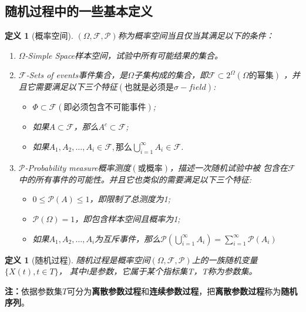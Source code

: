 \documentclass[12pt, a4paper, oneside]{ctexbook}
\newtheorem{definition}[theorem]{定义}
\newcommand\mc[1]{\mathcal{#1}}
\begin{document}
\subsection{随机过程中的一些基本定义}
\begin{definition}[概率空间]
    $(\Omega,\mathcal{F},\mc{P})$称为概率空间当且仅当其满足以下的条件：
    \begin{enumerate}[1.]
        \item $\Omega$-Simple Space样本空间，试验中所有可能结果的集合。
        \item $\mc{F}$-Sets of events事件集合，是$\Omega$子集构成的集合，即$\mc{F} \subset 2^{\Omega}(\Omega\text{的幂集})$
              ，并且它需要满足以下三个特征$\left(\text{也就是必须是}\sigma-field\right)$:
              \begin{itemize}
                  \item $\Phi \subset \mc{F}\left(\text{即必须包含不可能事件}\right)$;
                  \item 如果$A \subset \mc{F}$，那么$A^c \subset \mc{F}$;
                  \item 如果$A_{1},A_{2},\ldots,A_{i}\in\mathcal{F},\text{那么}\bigcup_{i=1}^{\infty}A_{i}\in\mathcal{F}$.
              \end{itemize}
        \item $\mc{P}$-Probability measure概率测度$\left(\text{或概率}\right)$，描述一次随机试验中被
              包含在$\mc{F}$中的所有事件的可能性。并且它也类似的需要满足以下三个特征:
              \begin{itemize}
                  \item $0\leq \mc{P}(A)\leq1$，即限制了总测度为1;
                  \item $\mc{P}(\Omega)=1$，即包含样本空间且概率为1;
                  \item 如果$A_{1},A_{2},\ldots,A_{i}$为互斥事件，那么$\mc{P}(\bigcup_{i=1}^{\infty}A_{i})
                            = \sum_{i=1}^{\infty}\mc{P}(A_i)$
              \end{itemize}
    \end{enumerate}
\end{definition}

\begin{definition}[随机过程]
    随机过程是概率空间$(\Omega,\mathcal{F},\mc{P})$上的一族随机变量$\{X(t),t \in T\}$，
    其中t是参数，它属于某个指标集T，T称为参数集。
\end{definition}
\textbf{注：}依据参数集$T$可分为\textbf{离散参数过程}和\textbf{连续参数过程}，把\textbf{离散参数过程}称为\textbf{随机序列}。
\end{document}
